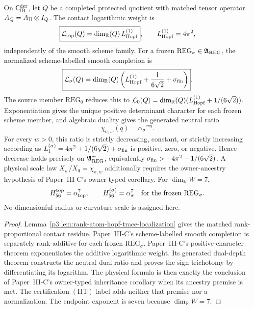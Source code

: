 \documentclass[12pt,a4paper]{article}
\begin{document}
\begin{theorem}
\label{p3:thm:reeb-universal}
On \(\mathsf C_{\rm IR}^{\rm der}\), let
\(Q\) be a completed protected quotient with matched tensor operator
\(A_Q=A_{\rm H}\otimes I_Q\).  The contact logarithmic weight is
\[
 \boxed{\mathcal L_{\rm top}(Q)
 =\dim_{\mathbb R}(Q)\,L_{\mathrm{Hopf}}^{(1)}},
 \qquad L_{\mathrm{Hopf}}^{(1)}=4\pi^2,
\]
independently of the smooth scheme family.  For a frozen
\(\mathrm{REG}_{\sigma}\in\mathfrak A_{\rm REG}\), the normalized
scheme-labelled smooth completion is
\[
 \boxed{\mathcal L_{\sigma}(Q)
 =\dim_{\mathbb R}(Q)
 \left(L_{\mathrm{Hopf}}^{(1)}+\frac1{6\sqrt2}+\sigma_{\rm fin}\right)}.
\]
The source member \(\mathrm{REG}_0\) reduces this to
\(\mathcal L_0(Q)=\dim_{\mathbb R}(Q)(L_{\mathrm{Hopf}}^{(1)}+1/(6\sqrt2))\).
Exponentiation gives the unique positive determinant character for each frozen
scheme member, and algebraic duality gives the generated neutral ratio
\[
 \chi_{\sigma,w}(q)=\alpha_\sigma^{-wq}.
\]
For every \(w>0\), this ratio is strictly decreasing, constant, or strictly
increasing according as
\(L_1^{(\sigma)}=4\pi^2+1/(6\sqrt2)+\sigma_{\rm fin}\) is positive, zero,
or negative.  Hence decrease holds precisely on
\(\mathfrak A_{\rm REG}^{+}\), equivalently
\(\sigma_{\rm fin}>-4\pi^2-1/(6\sqrt2)\).  A physical scale law
\(X_w/X_0=\chi_{\sigma,w}\) additionally requires the owner-ancestry
hypothesis of Paper~III-C's owner-typed corollary.  For
\(\dim_{\mathbb R}W=7\),
\[
 H_{56}^{\rm top}=\alpha_{\rm top}^{7},
 \qquad
 H_{56}^{(\sigma)}=\alpha_\sigma^{7}
 \quad\text{for the frozen }\mathrm{REG}_\sigma.
\]
No dimensionful radius or curvature scale is assigned here.
\end{theorem}

\begin{proof}
Lemma~\ref{p3:lem:rank-atom-hopf-trace-localization} gives the matched
rank-proportional contact residue.  Paper~III-C's scheme-labelled smooth completion is separately rank-additive
for each frozen \(\mathrm{REG}_\sigma\).  Paper~III-C's positive-character
theorem exponentiates the additive logarithmic weight.  Its generated
dual-depth theorem constructs the neutral dual ratio and proves the sign
trichotomy by differentiating its logarithm.  The physical formula is then
exactly the conclusion of Paper~III-C's owner-typed inheritance corollary when
its ancestry premise is met.  The certification \((\mathrm{HT})\) label adds neither
that premise nor a normalization.
The endpoint exponent is seven because \(\dim_{\mathbb R}W=7\).
\end{proof}
\end{document}
